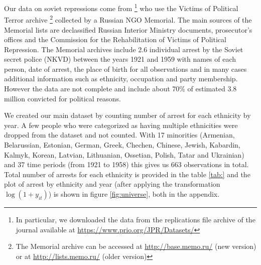 Our data on soviet repressions come from  \citet{zhukov_stalins_2018}\footnote{In particular, we downloaded the data from the replications file archive of the journal available  at \url{https://www.prio.org/JPR/Datasets/}} who use  the Victims of Political Terror archive \footnote{The Memorial archive can be accessed at \url{http://base.memo.ru/} (new version) or at \url{http://lists.memo.ru/} (older version)} collected by a Russian NGO Memorial. The main sources of the Memorial lists are declassified Russian Interior Ministry documents, prosecutor’s offices and the Commission for the Rehabilitation of Victims of Political Repression.
 The Memorial archives include 2.6 individual arrest by the Soviet secret police (NKVD) between  the years 1921 and 1959 with names of each person, date of arrest, the place of birth for all observations and  in many cases additional information such as ethnicity, occupation and party membership. 
 However the data are not complete and include about 70\% of estimated 3.8 million convicted for political reasons.

We created our main dataset by counting number of arrest for each ethnicity by year.  A few people who were categorized as having multiple ethnicities were dropped from the dataset and not counted. 
With 17  minorities (Armenian, Belarussian, Estonian, German, Greek, Chechen, Chinese, Jewish, Kabardin, Kalmyk, Korean, Latvian, Lithuanian, Ossetian, Polish, Tatar and Ukrainian) and 37 time periods (from 1921 to 1958) this gives us 663 observations in total. Total number of arrests for each ethnicity is provided in the table \ref{tab:} and the plot of arrest by ethnicity and year (after applying the transformation $\log\left(1 + y_{it}\right)$) is shown in figure \ref{fig:universe}, both in the appendix. 

